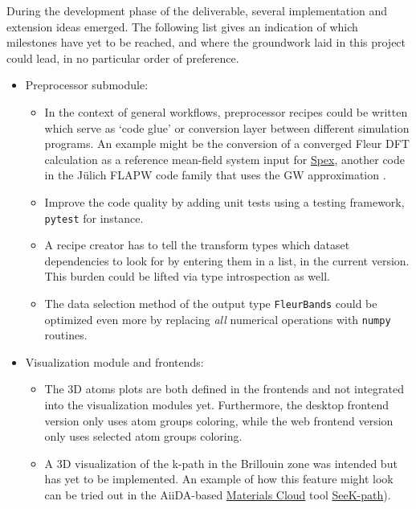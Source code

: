 During the development phase of the deliverable, several implementation and
extension ideas emerged. The following list gives an indication of which
milestones have yet to be reached, and where the groundwork laid in this project
could lead, in no particular order of preference.

\begin{itemize}
\item Preprocessor submodule:
    \begin{itemize}
    \item In the context of general workflows, preprocessor recipes could be
        written which serve as `code glue' or conversion layer between different
        simulation programs. An example might be the conversion of a converged
        Fleur DFT calculation as a reference mean-field system input for
        \href{https://spex.readthedocs.io/en/master/spex_and_fleur.html}{Spex},
        another code in the Jülich FLAPW code family that uses the GW
        approximation \cite{fleur-spex}.
    \item Improve the code quality by adding unit tests using a testing
        framework, \texttt{pytest} for instance.
    \item A recipe creator has to tell the transform types which dataset
        dependencies to look for by entering them in a list, in the current
        version. This burden could be lifted via type introspection as well.
    \item The data selection method of the output type \texttt{FleurBands} could
        be optimized even more by replacing \textit{all} numerical operations
        with \texttt{numpy} routines.
    \end{itemize}
\item Visualization module and frontends:
    \begin{itemize}
    \item The 3D atoms plots are both defined in the frontends and not
        integrated into the visualization modules yet. Furthermore, the desktop
        frontend version only uses atom groups coloring, while the web frontend version
        only uses selected atom groups coloring.
    \item A 3D visualization of the k-path in the Brillouin zone was intended
        but has yet to be implemented. An example of how this feature might look
        can be tried out in the AiiDA-based
        \href{https://www.materialscloud.org/home}{Materials Cloud} tool
        \href{https://www.materialscloud.org/work/tools/seekpath}{SeeK-path}).

\end{itemize}
\end{itemize}
